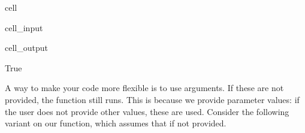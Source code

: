 \documentclass[letterpaper,10pt,english]{jupyterBook}
\begin{document}
\begin{sphinxuseclass}{cell}\begin{sphinxVerbatimInput}

\begin{sphinxuseclass}{cell_input}
\begin{sphinxVerbatim}[commandchars=\\\{\}]
        
\end{sphinxVerbatim}

\end{sphinxuseclass}\end{sphinxVerbatimInput}
\begin{sphinxVerbatimOutput}

\begin{sphinxuseclass}{cell_output}
\begin{sphinxVerbatim}[commandchars=\\\{\}]
True
\end{sphinxVerbatim}

\end{sphinxuseclass}\end{sphinxVerbatimOutput}

\end{sphinxuseclass}
\sphinxAtStartPar
A way to make your code more flexible is to use  arguments. If these are not provided, the function still runs. This is because we provide  parameter values: if the user does not provide other values, these are used. Consider the following variant on our function, which assumes that  if not provided.
\end{document}
